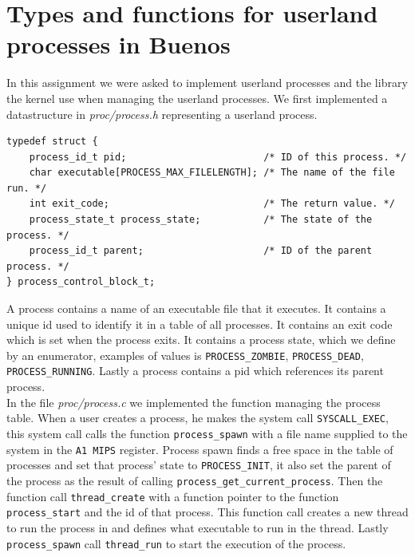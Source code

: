 \documentclass[11pt]{article}
\begin{document}
    \section{Types and functions for userland processes in Buenos}
    In this assignment we were asked to implement userland processes and the
    library the kernel use when managing the userland processes.  We first
    implemented a datastructure in \textit{proc/process.h} representing a
    userland process.

    \begin{lstlisting}[style=customc]
typedef struct {
    process_id_t pid;                        /* ID of this process. */
    char executable[PROCESS_MAX_FILELENGTH]; /* The name of the file run. */
    int exit_code;                           /* The return value. */
    process_state_t process_state;           /* The state of the process. */
    process_id_t parent;                     /* ID of the parent process. */
} process_control_block_t;
    \end{lstlisting}

    A process contains a name of an executable file that it executes.  It
    contains a unique id used to identify it in a table of all processes.  It
    contains an exit code which is set when the process exits. It contains a
    process state, which we define by an enumerator, examples of values is
    \texttt{PROCESS\_ZOMBIE}, \texttt{PROCESS\_DEAD}, \texttt{PROCESS\_RUNNING}.
    Lastly a process contains a pid which references its parent process. \\

    In the file \textit{proc/process.c} we implemented the function managing the
    process table.  When a user creates a process, he makes the system call
    \texttt{SYSCALL\_EXEC}, this system call calls the function
    \texttt{process\_spawn} with a file name supplied to the system in the
    \texttt{A1 MIPS} register.  Process spawn finds a free space in the table of
    processes and set that process' state to \texttt{PROCESS\_INIT}, it also set
    the parent of the process as the result of calling
    \texttt{process\_get\_current\_process}.  Then the function call
    \texttt{thread\_create} with a function pointer to the function
    \texttt{process\_start} and the id of that process.  This function call
    creates a new thread to run the process in and defines what executable to
    run in the thread.  Lastly \texttt{process\_spawn} call \texttt{thread\_run}
    to start the execution of the process. \\
\end{document}
